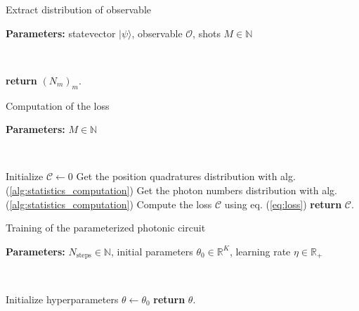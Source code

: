 \documentclass[reprint, amsmath, amssymb, aps]{revtex4-2}
\begin{document}
    \begin{algorithm}
        \caption{Extract distribution of observable}\label{alg:statistics_computation}
            \textbf{Parameters:} statevector $|\psi\rangle$, observable $\mathcal O$, shots $M\in\mathbb N$

            \

            \textbf{return} $(N_m)_m$.
    \end{algorithm}

    \begin{algorithm}
        \caption{Computation of the loss}\label{alg:loss_computation}
            \textbf{Parameters:} $M\in\mathbb N$

            \

            Initialize $\mathcal C \gets 0$\;
            Get the position quadratures distribution with alg. (\ref{alg:statistics_computation})\;
            Get the photon numbers distribution with alg. (\ref{alg:statistics_computation})\;
            Compute the loss $\mathcal C$ using eq. (\ref{eq:loss})\;
            \textbf{return} $\mathcal C$.
    \end{algorithm}

    \begin{algorithm}
        \caption{Training of the parameterized photonic circuit}\label{alg:training}
        \textbf{Parameters:} $N_\text{steps}\in\mathbb N$, initial parameters $\theta_0\in\mathbb R^K$, learning rate $\eta\in\mathbb R_+$

        \

        Initialize hyperparameters $\theta \gets \theta_0$\;
        \textbf{return} $\theta$.
    \end{algorithm}
\end{document}

